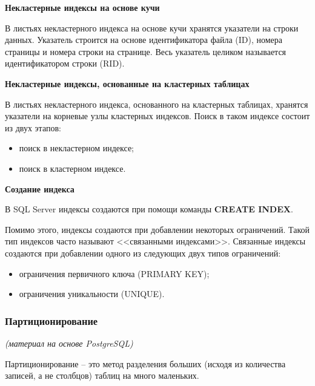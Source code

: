 \textbf{Некластерные индексы на основе кучи}

В листьях некластерного индекса на основе кучи хранятся указатели на строки данных. Указатель строится на основе идентификатора файла (ID), номера страницы и номера строки на странице. Весь указатель целиком называется идентификатором строки (RID).

\textbf{Некластерные индексы, основанные на кластерных таблицах}

В листьях некластерного индекса, основанного на кластерных таблицах, хранятся указатели на корневые узлы кластерных индексов. Поиск в таком индексе состоит из двух этапов:

\begin{itemize}
	\item поиск в некластерном индексе;
	\item поиск в кластерном индексе.
\end{itemize}

\textbf{Создание индекса}

В SQL Server индексы создаются при помощи команды \textbf{CREATE INDEX}.

Помимо этого, индексы создаются при добавлении некоторых ограничений. Такой тип индексов часто называют <<связанными индексами>>. Связанные индексы создаются при добавлении одного из следующих двух типов ограничений: 
\begin{itemize}
	\item ограничения первичного ключа (PRIMARY KEY); 
	\item ограничения уникальности (UNIQUE). 
\end{itemize}

\subsubsection{Партиционирование}
\textit{(материал на основе PostgreSQL)}

Партиционирование – это метод разделения больших (исходя из количества записей, а не столбцов) таблиц на много маленьких.

